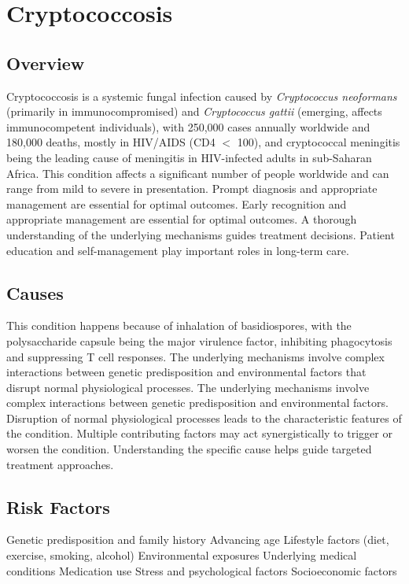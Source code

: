 \chapter{Cryptococcosis}
\label{sec:Cryptococcosis}

\section{Overview}
Cryptococcosis is a systemic fungal infection caused by \textit{Cryptococcus neoformans} (primarily in immunocompromised) and \textit{Cryptococcus gattii} (emerging, affects immunocompetent individuals), with 250,000 cases annually worldwide and 180,000 deaths, mostly in HIV/AIDS (CD4 $<$ 100), and cryptococcal meningitis being the leading cause of meningitis in HIV-infected adults in sub-Saharan Africa. This condition affects a significant number of people worldwide and can range from mild to severe in presentation. Prompt diagnosis and appropriate management are essential for optimal outcomes. Early recognition and appropriate management are essential for optimal outcomes. A thorough understanding of the underlying mechanisms guides treatment decisions. Patient education and self-management play important roles in long-term care.
\section{Causes}
This condition happens because of inhalation of basidiospores, with the polysaccharide capsule being the major virulence factor, inhibiting phagocytosis and suppressing T cell responses. The underlying mechanisms involve complex interactions between genetic predisposition and environmental factors that disrupt normal physiological processes. The underlying mechanisms involve complex interactions between genetic predisposition and environmental factors. Disruption of normal physiological processes leads to the characteristic features of the condition. Multiple contributing factors may act synergistically to trigger or worsen the condition. Understanding the specific cause helps guide targeted treatment approaches.
\section{Risk Factors}
Genetic predisposition and family history Advancing age Lifestyle factors (diet, exercise, smoking, alcohol) Environmental exposures Underlying medical conditions Medication use Stress and psychological factors Socioeconomic factors

